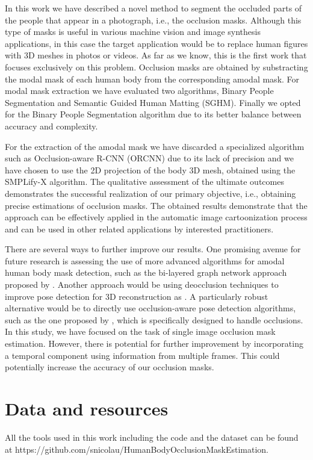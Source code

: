 \documentclass[]{interact}
\theoremstyle{plain}%
\theoremstyle{definition}
\theoremstyle{remark}
\begin{document}
{\color{blue}In this work we have described a novel method to segment the occluded parts of the people that appear in a photograph, i.e., the occlusion masks. Although this type of masks is useful in various machine vision and image synthesis applications, in this case the target application would be to replace human figures with 3D meshes in photos or videos. As far as we know, this is the first work that focuses exclusively on this problem. Occlusion masks are obtained by substracting the modal mask of each human body from the corresponding amodal mask. For modal mask extraction we have evaluated two algorithms, Binary People Segmentation and Semantic Guided Human Matting (SGHM). Finally we opted for the Binary People Segmentation algorithm due to its better balance between accuracy and complexity.

For the extraction of the amodal mask we have discarded a specialized algorithm such as Occlusion-aware R-CNN (ORCNN) due to its lack of precision and we have chosen to use the 2D projection of the body 3D mesh, obtained using the SMPLify-X algorithm. The qualitative assessment of the ultimate outcomes demonstrates the successful realization of our primary objective, i.e., obtaining precise estimations of occlusion masks. The obtained results demonstrate that the approach can be effectively applied in the automatic image cartoonization process and can be used in other related applications by interested practitioners. 

There are several ways to further improve our results. One promising avenue for future research is assessing the use of more advanced algorithms for amodal human body mask detection, such as the bi-layered graph network approach proposed by \citep{BiLayers}. Another approach would be using deocclusion techniques to improve pose detection for 3D reconstruction as \citep{sym14030531}. A particularly robust alternative would be to directly use occlusion-aware pose detection algorithms, such as the one proposed by \citep{OccShapePose}, which is specifically designed to handle occlusions. In this study, we have focused on the task of single image occlusion mask estimation. However, there is potential for further improvement by incorporating a temporal component using information from multiple frames. This could potentially increase the accuracy of our occlusion masks.} 


\section*{Data and resources}
All the tools used in this work including the code and the dataset can be found at https://github.com/snicolau/HumanBodyOcclusionMaskEstimation.
\end{document}
